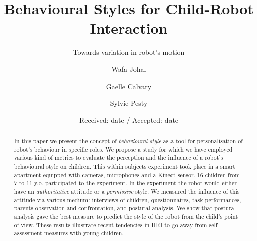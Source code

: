 \documentclass[a4paper,twocolumn]{svjour3}
\begin{document}
\title{Behavioural Styles for Child-Robot Interaction%
}
\subtitle{Towards variation in robot's motion}


\author{Wafa Johal         \and
        Gaelle Calvary \and %
        Sylvie Pesty
}



\date{Received: date / Accepted: date}
\maketitle
\begin{abstract}
	In this paper we present the concept of \emph{behavioural style} as a tool for personalisation of robot's behaviour in specific roles. 
	We propose a study for which we have employed various kind of metrics to evaluate the perception and the influence of a robot's behavioural style on children. 
	This within subjects experiment took place in a smart apartment equipped with cameras, microphones and a Kinect sensor. 16 children from 7 to 11 y.o. participated to the experiment.
	In the experiment the robot would either have an \emph{authoritative} attitude or a \emph{permissive} style. 
	We measured the influence of this attitude via various medium:
	interviews of children, questionnaires, task performances, parents observation and confrontation, and postural analysis. 
	We show that postural analysis gave the best measure to predict the style of the robot from the child's point of view.
	These results illustrate recent tendencies in HRI to go away from self-assessment measures with young children.
\end{abstract}
\end{document}
